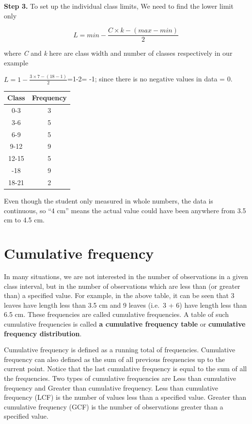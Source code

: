 \documentclass[
]{book}
\begin{document}
\textbf{Step 3.} To set up the individual class limits, We need to find the
lower limit only

\[L = min - \frac{C \times k - (max - min)}{2}\]

where \emph{C} and \emph{k} here are class width and number of classes respectively in our example

\(L = 1 - \frac{3 \times 7 - (18 - 1)}{2}\)=1-2= -1; since there is no
negative values in data = 0.

\begin{table}[H]
\centering
\begin{tabular}[t]{cc}
\toprule
Class & Frequency\\
\midrule
0-3 & 3\\
3-6 & 5\\
6-9 & 5\\
9-12 & 9\\
12-15 & 5\\
\addlinespace
15-18 & 9\\
18-21 & 2\\
\bottomrule
\end{tabular}
\end{table}

Even though the student only measured in whole numbers, the data is
continuous, so ``4 cm'' means the actual value could have been anywhere
from 3.5 cm to 4.5 cm.

\hypertarget{cumulative-frequency}{%
\section{Cumulative frequency}\label{cumulative-frequency}}

In many situations, we are not interested in the number of observations
in a given class interval, but in the number of observations which are
less than (or greater than) a specified value. For example, in the above
table, it can be seen that 3 leaves have length less than 3.5 cm and 9
leaves (i.e.~3 + 6) have length less than 6.5 cm. These frequencies are
called cumulative frequencies. A table of such cumulative frequencies is
called \textbf{a cumulative frequency table} or \textbf{cumulative frequency
distribution}.

Cumulative frequency is defined as a running total of frequencies.
Cumulative frequency can also defined as the sum of all previous
frequencies up to the current point. Notice that the last cumulative
frequency is equal to the sum of all the frequencies. Two types of
cumulative frequencies are Less than cumulative frequency and Greater
than cumulative frequency. Less than cumulative frequency (LCF) is the
number of values less than a specified value. Greater than cumulative
frequency (GCF) is the number of observations greater than a specified
value.
\end{document}
